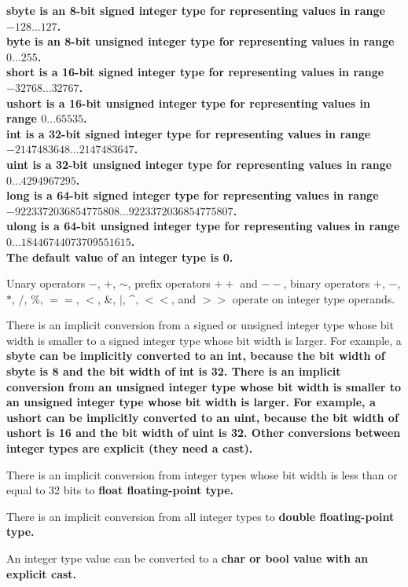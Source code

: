 \documentclass[a4paper,oneside,11pt]{article}
\begin{document}
\bf{sbyte} is an 8-bit signed integer type for representing values in range $-128 \ldots 127$.\\
\bf{byte} is an 8-bit unsigned integer type for representing values in range $0 \ldots 255$.\\
\bf{short} is a 16-bit signed integer type for representing values in range $-32768 \ldots 32767$.\\
\bf{ushort} is a 16-bit unsigned integer type for representing values in range $0 \ldots 65535$.\\
\bf{int} is a 32-bit signed integer type for representing values in range $-2147483648 \ldots 2147483647$.\\
\bf{uint} is a 32-bit unsigned integer type for representing values in range $0 \ldots 4294967295$.\\
\bf{long} is a 64-bit signed integer type for representing values in range\\
$-9223372036854775808 \ldots 9223372036854775807$.\\
\bf{ulong} is a 64-bit unsigned integer type for representing values in range $0 \ldots 18446744073709551615$.\\

The default value of an integer type is 0.

Unary operators $-$, $+$, $\sim$, prefix operators $++$ and $--$,
binary operators $+$, $-$, $*$, $/$, $\%$, $==$, $<$, \&, $|$, \^{}, $<<$, and $>>$ operate on integer type operands.

There is an implicit conversion from a signed or unsigned integer type whose bit width is smaller to a signed integer type whose bit width is larger.
For example, a \bf{sbyte} can be implicitly converted to an \bf{int}, because the bit width of \bf{sbyte} is 8 and the bit width of \bf{int} is 32.
There is an implicit conversion from an unsigned integer type whose bit width is smaller to an unsigned integer type whose bit width is larger.
For example, a \bf{ushort} can be implicitly converted to an \bf{uint}, because the bit width of \bf{ushort} is 16 and the bit width of \bf{uint} is 32.
Other conversions between integer types are explicit (they need a \bf{cast}).

There is an implicit conversion from integer types whose bit width is less than or equal to 32 bits to \bf{float} floating-point type.

There is an implicit conversion from all integer types to \bf{double} floating-point type.

An integer type value can be converted to a \bf{char} or \bf{bool} value with an explicit \bf{cast}.
\end{document}
